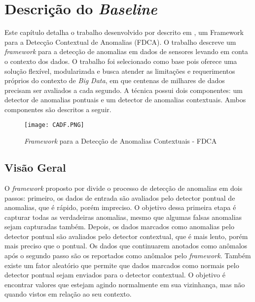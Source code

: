 \documentclass[cic,tc]{iiufrgs}
\begin{document}
\chapter{Descrição do \textit{Baseline}}
\label{cap_baseline}
Este capítulo detalha o trabalho desenvolvido por \citeauthor{ContextualMichael2014} descrito em \cite{ContextualMichael2014}, um Framework para a Detecção Contextual de Anomalias (FDCA). O trabalho descreve um \textit{framework} para a detecção de anomalias em dados de sensores levando em conta o contexto dos dados. O trabalho foi selecionado como base pois oferece uma solução flexível, modularizada e busca atender as limitações e requerimentos próprios do contexto de \textit{Big Data}, em que centenas de milhares de dados precisam ser avaliados a cada segundo. A técnica possui dois componentes: um detector de anomalias pontuais e um detector de anomalias contextuais. Ambos componentes são descritos a seguir.


\begin{figure}
	\caption{\textit{Framework} para a Detecção de Anomalias Contextuais - FDCA}
	\bigskip
		\begin{center}
			\texttt{[image: CADF.PNG]}
		\end{center}
	\label{cadf_arq}
\end{figure}


\section{Visão Geral}
O \textit{framework} proposto por \cite{ContextualMichael2014} divide o processo de detecção de anomalias em dois passos: primeiro, os dados de entrada são avaliados pelo detector pontual de anomalias, que é rápido, porém impreciso. O objetivo dessa primeira etapa é capturar todas as verdadeiras anomalias, mesmo que algumas falsas anomalias sejam capturadas também. Depois, os dados marcados como anomalias pelo detector pontual são avaliados pelo detector contextual, que é mais lento, porém mais preciso que o pontual. Os dados que continuarem anotados como anômalos após o segundo passo são os reportados como anômalos pelo \textit{framework}. Também existe um fator aleatório que permite que dados marcados como normais pelo detector pontual sejam enviados para o detector contextual. O objetivo é encontrar valores que estejam agindo normalmente em sua vizinhança, mas não quando vistos em relação ao seu contexto. 
\end{document}
